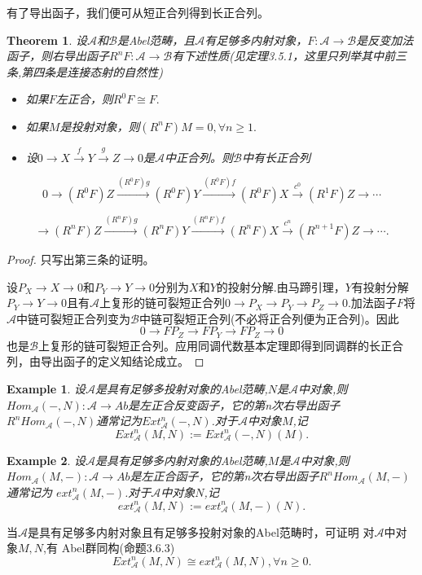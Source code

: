 \documentclass[UTF8]{article}
\newtheorem{thm}{Theorem}[section]
\newtheorem{exa}{Example}[section]
\begin{document}
有了导出函子，我们便可从短正合列得到长正合列。
\begin{thm}
设$\mathcal{A}$和$\mathcal{B}$是Abel范畴，且$\mathcal{A}$有足够多内射对象，$F:\mathcal{A}\rightarrow \mathcal{B}$是反变加法函子，则右导出函子$R^{n}F:\mathcal{A}\rightarrow\mathcal{B}$有下述性质(见\cite{zh}定理3.5.1，这里只列举其中前三条,第四条是连接态射的自然性)
\begin{itemize}
	\item 如果$F$左正合，则$R^{0}F\cong F.$
	\item 如果$M$是投射对象，则$(R^{n}F)M=0,\forall n\geq 1.$
	\item 设$0\rightarrow X\stackrel{f}{\longrightarrow}Y\stackrel{g}{\longrightarrow}Z\rightarrow 0$是$\mathcal{A}$中正合列。则$\mathcal{B}$中有长正合列
\end{itemize}
$$
0\rightarrow (R^{0}F)Z\stackrel{(R^{0}F)g}{\rightarrow}(R^{0}F)Y\stackrel{(R^{0}F)f}{\rightarrow}(R^{0}F)X\stackrel{c^{0}}{\rightarrow}(R^{1}F)Z\rightarrow \cdots$$

$$\rightarrow(R^{n}F)Z\stackrel{(R^{n}F)g}{\rightarrow}(R^{n}F)Y\stackrel{(R^{n}F)f}{\rightarrow}(R^{n}F)X\stackrel{c^{n}}{\rightarrow}(R^{n+1}F)Z\rightarrow \cdots.
$$
\end{thm}
\begin{proof}
	只写出第三条的证明。
	
	
	设$P_{X}\rightarrow X\rightarrow0$和$P_{Y}\rightarrow Y\rightarrow 0$分别为$X$和$Y$的投射分解.由马蹄引理，$Y$有投射分解$P_{Y}\rightarrow Y\rightarrow0$且有$\mathcal{A}$上复形的链可裂短正合列$0\rightarrow P_{X}\rightarrow P_{Y}\rightarrow P_{Z}\rightarrow0$.加法函子$F$将$\mathcal{A}$中链可裂短正合列变为$\mathcal{B}$中链可裂短正合列(不必将正合列便为正合列)。因此$$
	0\rightarrow FP_{Z}\rightarrow FP_{Y}\rightarrow FP_{Z}\rightarrow 0
	$$
	也是$\mathcal{B}$上复形的链可裂短正合列。应用同调代数基本定理即得到同调群的长正合列，由导出函子的定义知结论成立。
\end{proof}
\begin{exa}
	设$\mathcal{A}$是具有足够多投射对象的Abel范畴,$N$是$\mathcal{A}$中对象,则$Hom_{\mathcal{A}}(-,N):\mathcal{A}\rightarrow Ab$是左正合反变函子，它的第n次右导出函子$R^{n}Hom_{\mathcal{A}}(-,N)$通常记为$Ext^{n}_{\mathcal{A}}(-,N)$.对于$\mathcal{A}$中对象$M$,记
	$$Ext_{\mathcal{A}}^{n}(M,N):=Ext_{\mathcal{A}}^{n}(-,N)(M).$$
\end{exa}
\begin{exa}
	设$\mathcal{A}$是具有足够多内射对象的Abel范畴,$M$是$\mathcal{A}$中对象,则$Hom_{\mathcal{A}}(M,-):\mathcal{A}\rightarrow Ab$是左正合函子，它的第n次右导出函子$R^{n}Hom_{\mathcal{A}}(M,-)$通常记为
	$ext^{n}_{\mathcal{A}}(M,-)$.对于$\mathcal{A}$中对象$N$,记
	$$ext_{\mathcal{A}}^{n}(M,N):=ext_{\mathcal{A}}^{n}(M,-)(N).$$
\end{exa}
当$\mathcal{A}$是具有足够多内射对象且有足够多投射对象的Abel范畴时，可证明
对$\mathcal{A}$中对象$M,N$,有
Abel群同构(\cite{zh}命题3.6.3)
$$
Ext_{\mathcal{A}}^{n}(M,N)\cong ext_{\mathcal{A}}^{n}(M,N),\forall n\geq 0.
$$
\newpage
\end{document}
